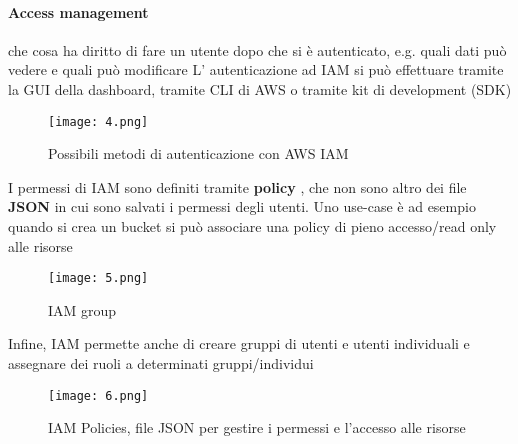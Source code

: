 \paragraph{Access management} che cosa ha diritto di fare un utente dopo che si è autenticato, e.g. quali dati può vedere e quali può modificare
L' autenticazione  ad IAM si può effettuare tramite la GUI della dashboard, tramite CLI di AWS o tramite kit di development (SDK)
\begin{figure}[h!]
    \centering
    \texttt{[image: 4.png]}
    \caption{Possibili metodi di autenticazione con AWS IAM}
    \label{fig:enter-label}
\end{figure}
\newpage
I  permessi  di IAM sono definiti tramite  \textbf{policy} , che non sono altro dei file \textbf{JSON} in cui sono salvati i permessi degli utenti. Uno use-case è ad esempio quando si crea un bucket si può associare una policy di pieno accesso/read only alle risorse
\begin{figure}[h!]
    \centering
    \texttt{[image: 5.png]}
    \caption{IAM group}
    \label{fig:enter-label}
\end{figure}

Infine, IAM permette anche di creare gruppi di utenti e utenti individuali e assegnare dei ruoli a determinati gruppi/individui
\begin{figure}[h!]
    \centering
    \texttt{[image: 6.png]}
    \caption{IAM Policies, file JSON per gestire i permessi e l'accesso alle risorse}
    \label{fig:enter-label}
\end{figure}